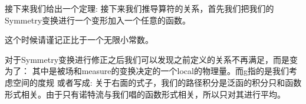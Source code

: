 接下来我们给出一个定理:
接下来我们推导算符的关系，首先我们把我们的Symmetry变换进行一个变形加入一个任意的函数\seq{\rho(\sigma)}。
\eq{
    \phi_\alpha^{\prime}(\sigma)=\phi_\alpha(\sigma)+\rho(\sigma)\delta\phi_\alpha(\sigma)
}

这个时候请谨记\seq{\delta \phi_\alpha(\sigma)}正比于一个无限小常数\seq{\epsilon}。

对于Symmetry变换进行修正之后我们可以发现之前定义的关系不再满足，而是变为了：
其中是被场和measure的变换决定的一个local的物理量。而g指的是我们考虑空间的度规
或者写成:
关于右面的式子，我们的路径积分是泛函的积分只和函数形式相关。由于只有诺特流与我们唱的函数形式相关，所以只对其进行平均。

